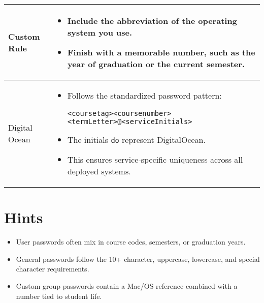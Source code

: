 \begin{longtable}{|p{3cm}|p{13cm}|}
Custom Rule & 
\begin{itemize}
    \item Include the abbreviation of the operating system you use. 
    \item Finish with a memorable number, such as the year of graduation or the current semester.
\end{itemize} \\
\hline



Digital Ocean & 
\begin{itemize}
    \item Follows the standardized password pattern:
    \begin{center}
        \texttt{<coursetag><coursenumber><termLetter>@<serviceInitials>}
    \end{center}
    \item The initials \texttt{do} represent DigitalOcean.
    \item This ensures service-specific uniqueness across all deployed systems.
\end{itemize} \\
\hline

\end{longtable}



\section*{Hints}
\begin{itemize}
    \item User passwords often mix in course codes, semesters, or graduation years. 
    \item General passwords follow the 10+ character, uppercase, lowercase, and special character requirements. 
    \item Custom group passwords contain a Mac/OS reference combined with a number tied to student life.
\end{itemize}